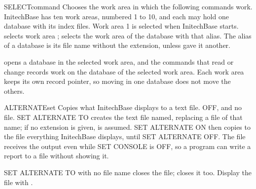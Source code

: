 \begin{XbaseEntry}{SELECT}{command}
Chooses the work area in which the following commands work.
\Syntax
{}
\Usage
InitechBase has ten work areas, numbered 1 to 10, and each may hold one
database with its index files.  Work area 1 is selected when InitechBase
starts.    selects work area ;  
selects the work area of the database with that alias.  The alias of a
database is its file name without the extension, unless  gave it
another.

 opens a database in the selected work area, and the commands that
read or change records work on the database of the selected work area.  Each
work area keeps its own record pointer, so moving in one database does not
move the others.
\Examples
{}
\end{XbaseEntry}

\begin{XbaseEntry}{ALTERNATE}{set}
Copies what InitechBase displays to a text file.
\Syntax
{}
\Defaults
OFF, and no file.
\Usage
SET ALTERNATE TO creates the text file named, replacing a file of that name;
if no extension is given,  is assumed.  SET ALTERNATE ON then
copies to the file everything InitechBase displays, until SET ALTERNATE OFF.
The file receives the output even while SET CONSOLE is OFF, so a program can
write a report to a file without showing it.

SET ALTERNATE TO with no file name closes the file;  closes it
too.  Display the file with .
\end{XbaseEntry}

